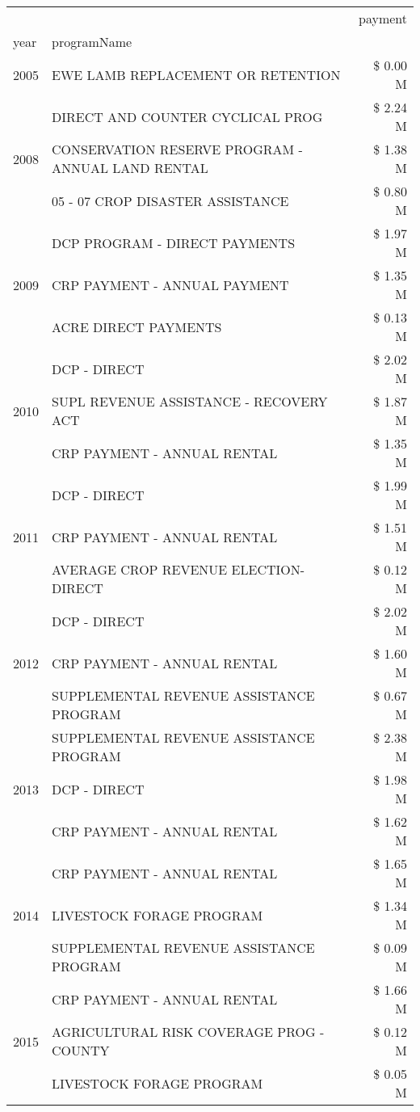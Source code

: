 \begin{tabular}{llr}
\toprule
 &  & payment \\
year & programName &  \\
\midrule
2005 & EWE LAMB REPLACEMENT OR RETENTION & \$ 0.00 M \\
\cline{1-3}
\multirow[t]{3}{*}{2008} & DIRECT AND COUNTER CYCLICAL PROG & \$ 2.24 M \\
 & CONSERVATION RESERVE PROGRAM - ANNUAL LAND RENTAL & \$ 1.38 M \\
 & 05 - 07 CROP DISASTER ASSISTANCE & \$ 0.80 M \\
\cline{1-3}
\multirow[t]{3}{*}{2009} & DCP PROGRAM - DIRECT PAYMENTS & \$ 1.97 M \\
 & CRP PAYMENT - ANNUAL PAYMENT & \$ 1.35 M \\
 & ACRE DIRECT PAYMENTS & \$ 0.13 M \\
\cline{1-3}
\multirow[t]{3}{*}{2010} & DCP - DIRECT & \$ 2.02 M \\
 & SUPL REVENUE ASSISTANCE - RECOVERY ACT & \$ 1.87 M \\
 & CRP PAYMENT - ANNUAL RENTAL & \$ 1.35 M \\
\cline{1-3}
\multirow[t]{3}{*}{2011} & DCP - DIRECT & \$ 1.99 M \\
 & CRP PAYMENT - ANNUAL RENTAL & \$ 1.51 M \\
 & AVERAGE CROP REVENUE ELECTION-DIRECT & \$ 0.12 M \\
\cline{1-3}
\multirow[t]{3}{*}{2012} & DCP - DIRECT & \$ 2.02 M \\
 & CRP PAYMENT - ANNUAL RENTAL & \$ 1.60 M \\
 & SUPPLEMENTAL REVENUE ASSISTANCE PROGRAM & \$ 0.67 M \\
\cline{1-3}
\multirow[t]{3}{*}{2013} & SUPPLEMENTAL REVENUE ASSISTANCE PROGRAM & \$ 2.38 M \\
 & DCP - DIRECT & \$ 1.98 M \\
 & CRP PAYMENT - ANNUAL RENTAL & \$ 1.62 M \\
\cline{1-3}
\multirow[t]{3}{*}{2014} & CRP PAYMENT - ANNUAL RENTAL & \$ 1.65 M \\
 & LIVESTOCK FORAGE PROGRAM & \$ 1.34 M \\
 & SUPPLEMENTAL REVENUE ASSISTANCE PROGRAM & \$ 0.09 M \\
\cline{1-3}
\multirow[t]{3}{*}{2015} & CRP PAYMENT - ANNUAL RENTAL & \$ 1.66 M \\
 & AGRICULTURAL RISK COVERAGE PROG - COUNTY & \$ 0.12 M \\
 & LIVESTOCK FORAGE PROGRAM & \$ 0.05 M \\

\end{tabular}
